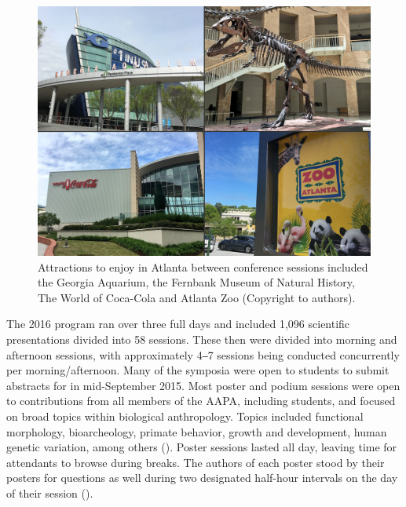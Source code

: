 \documentclass[english]{ijsra}
\begin{document}
\begin{figure} %
		\includegraphics[width=\linewidth]{figures/Ward-Figure2}
		\caption{Attractions to enjoy in Atlanta between conference sessions included the Georgia Aquarium, the Fernbank Museum of Natural History, The World of Coca-Cola and Atlanta Zoo (Copyright to authors).}
		\centering
		\label{fig:Ward-Figure2}
	\end{figure}

The 2016 program ran over three full days and included 1,096 scientific presentations divided into 58 sessions.
These then were divided into morning and afternoon sessions, 
with approximately 4‒7 sessions being conducted concurrently per morning/afternoon. 
Many of the symposia were open to students to submit abstracts for in mid-September 2015.
Most poster and podium sessions were open to contributions from all members of the AAPA, including students,
and focused on broad topics within biological anthropology.
Topics included functional morphology, bioarcheology, primate behavior, growth and development, human genetic variation,
among others ().
Poster sessions lasted all day, leaving time for attendants to browse during breaks.
The authors of each poster stood by their posters for questions as well during two designated half-hour intervals on
the day of their session ().
\end{document}
